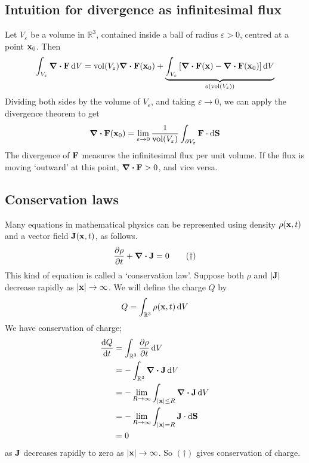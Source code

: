 \subsection{Intuition for divergence as infinitesimal flux}
Let \(V_\varepsilon\) be a volume in \(\mathbb R^3\), contained inside a ball of radius \(\varepsilon > 0\), centred at a point \(\vb x_0\).
Then
\[
	\int_{V_\varepsilon} \div{\vb F} \dd{V} = \mathrm{vol}(V_\varepsilon) \div{\vb F}(\vb x_0) + \underbrace{\int_{V_\varepsilon}  \left[ \div{\vb F}(\vb x) - \div{\vb F}(\vb x_0) \right] \dd{V}}_{o(\mathrm{vol}(V_\varepsilon))}
\]
Dividing both sides by the volume of \(V_\varepsilon\), and taking \(\varepsilon \to 0\), we can apply the divergence theorem to get
\[
	\div{\vb F}(\vb x_0) = \lim_{\varepsilon \to 0} \frac{1}{\mathrm{vol}(V_\varepsilon)} \int_{\partial V_\varepsilon} \vb F \cdot \dd{\vb S}
\]
The divergence of \(\vb F\) measures the infinitesimal flux per unit volume.
If the flux is moving `outward' at this point, \(\div{\vb F} > 0\), and vice versa.

\subsection{Conservation laws}
Many equations in mathematical physics can be represented using density \(\rho(\vb x, t)\) and a vector field \(\vb J(\vb x, t)\), as follows.
\begin{equation}
	\pdv{\rho}{t} + \div{\vb J} = 0 \tag{\(\dagger\)}
\end{equation}
This kind of equation is called a `conservation law'.
Suppose both \(\rho\) and \(\abs{\vb J}\) decrease rapidly as \(\abs{\vb x} \to \infty\).
We will define the charge \(Q\) by
\[
	Q = \int_{\mathbb R^3} \rho(\vb x, t) \dd{V}
\]
We have conservation of charge;
\begin{align*}
	\dv{Q}{t} & = \int_{\mathbb R^3} \pdv{\rho}{t} \dd{V}                            \\
	          & = -\int_{\mathbb R^3} \div{\vb J} \dd{V}                             \\
	          & = -\lim_{R \to \infty} \int_{\abs{\vb x} \leq R} \div{\vb J} \dd{V}  \\
	          & = -\lim_{R \to \infty} \int_{\abs{\vb x} = R} \vb J \cdot \dd{\vb S} \\
	          & = 0                                                                  \\
\end{align*}
as \(\vb J\) decreases rapidly to zero as \(\abs{\vb x} \to \infty\).
So \((\dagger)\) gives conservation of charge.

